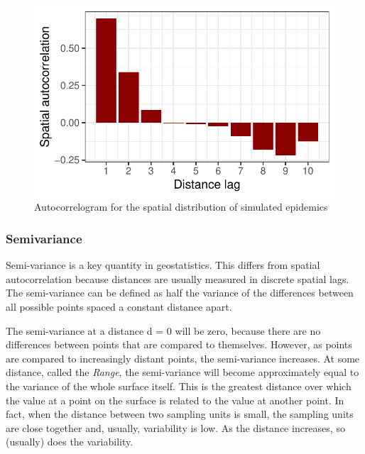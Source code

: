 \documentclass[
  letterpaper,
  DIV=11,
  numbers=noendperiod]{scrreprt}
\begin{document}
\begin{figure}[H]

{\centering \includegraphics{spatial-tests_files/figure-pdf/fig-autocorrel2-1.pdf}

}

\caption{\label{fig-autocorrel2}Autocorrelogram for the spatial
distribution of simulated epidemics}

\end{figure}

\hypertarget{semivariance}{%
\subsubsection{Semivariance}\label{semivariance}}

Semi-variance is a key quantity in geostatistics. This differs from
spatial autocorrelation because distances are usually measured in
discrete spatial lags. The semi-variance can be defined as half the
variance of the differences between all possible points spaced a
constant distance apart.

The semi-variance at a distance d = 0 will be zero, because there are no
differences between points that are compared to themselves. However, as
points are compared to increasingly distant points, the semi-variance
increases. At some distance, called the \emph{Range}, the semi-variance
will become approximately equal to the variance of the whole surface
itself. This is the greatest distance over which the value at a point on
the surface is related to the value at another point. In fact, when the
distance between two sampling units is small, the sampling units are
close together and, usually, variability is low. As the distance
increases, so (usually) does the variability.
\end{document}
